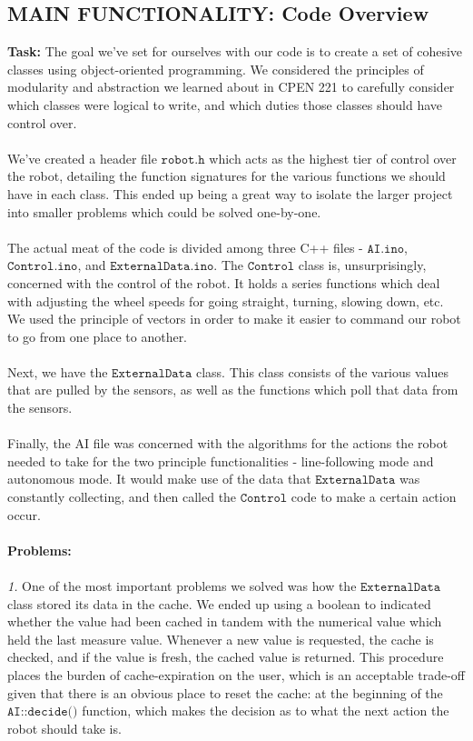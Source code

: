 \documentclass[paper=a4, fontsize=11pt]{scrartcl}
\numberwithin{equation}{section}		%
\numberwithin{figure}{section}			%
\numberwithin{table}{section}				%
\begin{document}
{\subsection{MAIN FUNCTIONALITY: Code Overview}
\textbf{Task: } The goal we've set for ourselves with our code is to create a set of cohesive classes using object-oriented programming. We considered the principles of modularity and abstraction we learned about in CPEN 221 to carefully consider which classes were logical to write, and which duties those classes should have control over.
\\\\
We've created a header file $\texttt{robot.h}$ which acts as the highest tier of control over the robot, detailing the function signatures for the various functions we should have in each class. This ended up being a great way to isolate the larger project into smaller problems which could be solved one-by-one. 
\\\\
The actual meat of the code is divided among three C++ files - $\texttt{AI.ino}$, $\texttt{Control.ino}$, and $\texttt{ExternalData.ino}$. The $\texttt{Control}$ class is, unsurprisingly, concerned with the control of the robot. It holds a series functions which deal with adjusting the wheel speeds for going straight, turning, slowing down, etc. We used the principle of vectors in order to make it easier to command our robot to go from one place to another.
\\\\
Next, we have the $\texttt{ExternalData}$ class. This class consists of the various values that are pulled by the sensors, as well as the functions which poll that data from the sensors.
\\\\
Finally, the AI file was concerned with the algorithms for the actions the robot needed to take for the two principle functionalities - line-following mode and autonomous mode. It would make use of the data that $\texttt{ExternalData}$ was constantly collecting, and then called the $\texttt{Control}$ code to make a certain action occur.
\\\\
\textbf{Problems: }
\\\\
\textit{1. }One of the most important problems we solved was how the $\texttt{ExternalData}$ class stored its data in the cache. We ended up using a boolean to indicated whether the value had been cached in tandem with the numerical value which held the last measure value. Whenever a new value is requested, the cache is checked, and if the value is fresh, the cached value is returned. This procedure places the burden of cache-expiration on the user, which is an acceptable trade-off given that there is an obvious place to reset the cache: at the beginning of the $\texttt{AI::decide()}$ function, which makes the decision as to what the next action the robot should take is.
}
\end{document}
